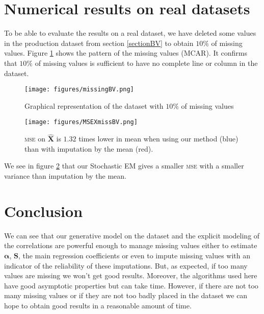 \documentclass[12pt,a4paper]{report}
\begin{document}
	\section{Numerical results on real datasets}	
		To be able to evaluate the results on a real dataset, we have deleted some values in the production dataset from section \ref{sectionBV} to obtain $10\%$ of missing values. Figure \ref{missingBV} shows the pattern of the missing values (MCAR). It confirms that $10\%$ of missing values is sufficient to have no complete line or column in the dataset. 
	
	\begin{figure}[h!]
		\centering
		\texttt{[image: figures/missingBV.png]} 
		\caption{Graphical representation of the dataset with $10\%$ of missing values}\label{missingBV}
	\end{figure}
	\begin{figure}[h!]
		\centering
		\texttt{[image: figures/MSEXmissBV.png]} 
		\caption{\textsc{mse} on $\hat{\boldsymbol{X}}$ is $1.32$ times lower in mean when using our method (blue) than with imputation by the mean (red).}\label{MSEXmissBV}
	\end{figure}
	We see in figure \ref{MSEXmissBV} that our Stochastic EM gives a smaller \textsc{mse} with a smaller variance than imputation by the mean. 
	
\FloatBarrier	
\section{Conclusion}	We can see that our generative model on the dataset and the explicit modeling of the correlations are powerful enough to manage missing values either to estimate $\boldsymbol{\alpha}$, $\boldsymbol{S}$, the main regression coefficients or even to impute missing values with an indicator of the reliability of these imputations. But, as expected, 
 if too many values are missing we won't get good results. Moreover, the algorithms used here have good asymptotic properties but can take time.
 However, if there are not too many missing values or if they are not too badly placed in the dataset we can hope to obtain good results in a reasonable amount of time.\\
\end{document}
